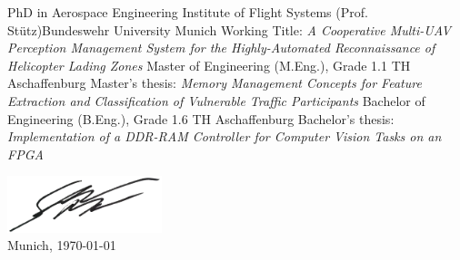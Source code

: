 		{PhD in Aerospace Engineering}
		{{Institute of Flight Systems (Prof. Stütz)\newline Bundeswehr University Munich}}
		{Working Title: \textit{\glqq A Cooperative Multi-UAV Perception Management System for the Highly-Automated Reconnaissance of Helicopter Lading Zones\grqq}}
		{}
	\vfill\null
		{Master of Engineering (M.Eng.), Grade 1.1}
		{TH Aschaffenburg}
		{Master's thesis: \textit{\glqq Memory Management Concepts for Feature Extraction and Classification of Vulnerable Traffic Participants\grqq}}
		{}
	\vfill\null
		{Bachelor of Engineering (B.Eng.), Grade 1.6}
		{TH Aschaffenburg}
		{Bachelor's thesis: \textit{\glqq Implementation of a DDR-RAM Controller for Computer Vision Tasks on an FPGA\grqq}}
		{}
	\vfill\null

\mbox{}
\vfill
\mbox{}
\vfill
\mbox{}
\vfill
\mbox{}
\vfill
\mbox{}
\vfill

\hspace*{5.5cm}\includegraphics[width=4.5cm]{data/img/unterschrift_klein}\\[-6pt]
Munich, \today     \hspace{1cm}   \hrulefill

\hspace*{30mm}\phantom{Munich, \today }\name